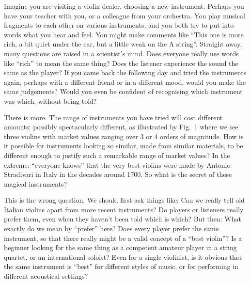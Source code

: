   Imagine you are visiting a violin dealer, choosing a new instrument. Perhaps 
  you have your teacher with you, or a colleague from your orchestra. You play 
  musical fragments to each other on various instruments, and you both try to 
  put into words what you hear and feel. You might make comments like ``This 
  one is more rich, a bit quiet under the ear, but a little weak on the A 
  string''. Straight away, many questions are raised in a scientist's mind. 
  Does everyone really use words like ``rich'' to mean the same thing? Does the 
  listener experience the sound the same as the player? If you came back the 
  following day and tried the instruments again, perhaps with a different 
  friend or in a different mood, would you make the same judgements? Would you 
  even be confident of recognising which instrument was which, without being 
  told? 




  There is more. The range of instruments you have tried will cost different 
  amounts: possibly spectacularly different, as illustrated by Fig.\ 1 where we 
  see three violins with market values ranging over 3 or 4 orders of magnitude. 
  How is it possible for instruments looking so similar, made from similar 
  materials, to be different enough to justify such a remarkable range of 
  market values? In the extreme: ``everyone knows'' that the very best violins 
  were made by Antonio Stradivari in Italy in the decades around 1700. So what 
  is the secret of these magical instruments? 

  This is the wrong question. We should first ask things like: Can we really 
  tell old Italian violins apart from more recent instruments? Do players or 
  listeners really prefer them, even when they haven't been told which is 
  which? But then: What exactly do we mean by ``prefer'' here? Does every 
  player prefer the same instrument, so that there really might be a valid 
  concept of a ``best violin''? Is a beginner looking for the same thing as a 
  competent amateur player in a string quartet, or an international soloist? 
  Even for a single violinist, is it obvious that the same instrument is 
  ``best'' for different styles of music, or for performing in different 
  acoustical settings? 

